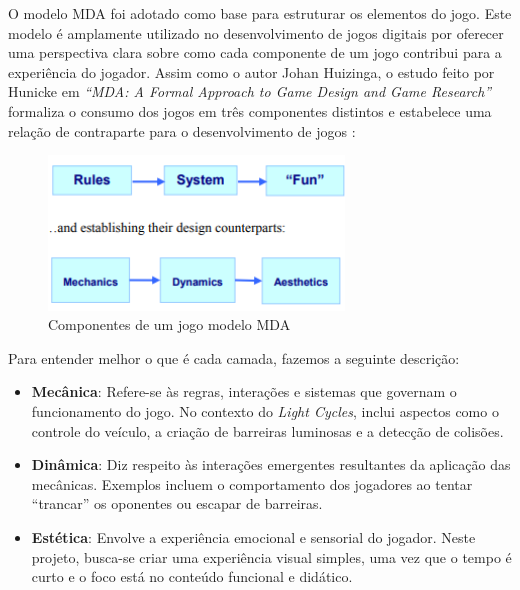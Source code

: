 O modelo MDA foi adotado como base para estruturar os elementos do jogo. Este modelo é amplamente utilizado no desenvolvimento de jogos digitais por oferecer uma perspectiva clara sobre como cada componente de um jogo contribui para a experiência do jogador. Assim como o autor Johan Huizinga, o estudo feito por Hunicke em \textit{“MDA: A Formal Approach to Game Design and Game Research”} formaliza o consumo dos jogos em três componentes distintos e estabelece uma relação de contraparte para o desenvolvimento de jogos \cite{hunicke2004}:

\begin{figure}[htbp]
    \centering
    \caption{Componentes de um jogo modelo MDA}
    \label{fig:mda-comp}
    \includegraphics[width=0.7\textwidth]{figuras/hunicke.png}
\end{figure}

Para entender melhor o que é cada camada, fazemos a seguinte descrição:

\begin{itemize}
    \item \textbf{Mecânica}: Refere-se às regras, interações e sistemas que governam o funcionamento do jogo. No contexto do \textit{Light Cycles}, inclui aspectos como o controle do veículo, a criação de barreiras luminosas e a detecção de colisões.
    
    \item \textbf{Dinâmica}: Diz respeito às interações emergentes resultantes da aplicação das mecânicas. Exemplos incluem o comportamento dos jogadores ao tentar ``trancar'' os oponentes ou escapar de barreiras.
    
    \item \textbf{Estética}: Envolve a experiência emocional e sensorial do jogador. Neste projeto, busca-se criar uma experiência visual simples, uma vez que o tempo é curto e o foco está no conteúdo funcional e didático.
\end{itemize}

